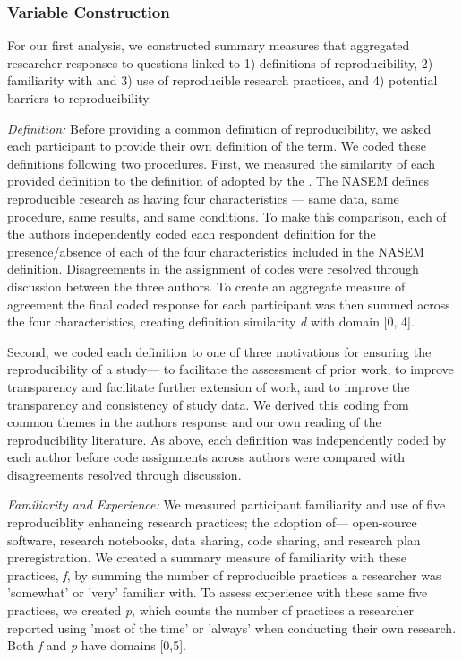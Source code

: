 \documentclass[]{interact}
\theoremstyle{plain}%
\theoremstyle{definition}
\theoremstyle{remark}
\begin{document}
\subsubsection*{Variable Construction}
For our first analysis, we constructed summary measures that aggregated researcher responses to questions linked to 1) definitions of reproducibility, 2) familiarity with and 3) use of reproducible research practices, and 4) potential barriers to reproducibility. 

\textit{Definition:} Before providing a common definition of reproducibility, we asked each participant to provide their own definition of the term.
We coded these definitions following two procedures.
First, we measured the similarity of each provided definition to the definition of adopted by the \citet{NASEM2019}. 
The NASEM defines reproducible research as having four characteristics --- same data, same procedure, same results, and same conditions.
To make this comparison, each of the authors independently coded each respondent definition for the presence/absence of each of the four characteristics included in the NASEM definition.
Disagreements in the assignment of codes were resolved through discussion between the three authors.
To create an aggregate measure of agreement the final coded response for each participant was then summed across the four characteristics, creating definition similarity \textit{d} with domain [0, 4].

Second, we coded each definition to one of three motivations for ensuring the reproducibility of a study--- to facilitate the assessment of prior work, to improve transparency and facilitate further extension of work, and to improve the transparency and consistency of study data.
We derived this coding from common themes in the authors response and our own reading of the reproducibility literature.
As above, each definition was independently coded by each author before code assignments across authors were compared with disagreements resolved through discussion.

\textit{Familiarity and Experience:} We measured participant familiarity and use of five reproduciblity enhancing research practices; the adoption of--- open-source software, research notebooks, data sharing, code sharing, and research plan preregistration. 
We created a summary measure of familiarity with these practices, \textit{f}, by summing the number of reproducible practices a researcher was 'somewhat' or 'very' familiar with.
To assess experience with these same five practices, we created \textit{p}, which counts the number of practices a researcher reported using 'most of the time' or 'always' when conducting their own research. 
Both \textit{f} and \textit{p} have domains [0,5]. 
\end{document}
